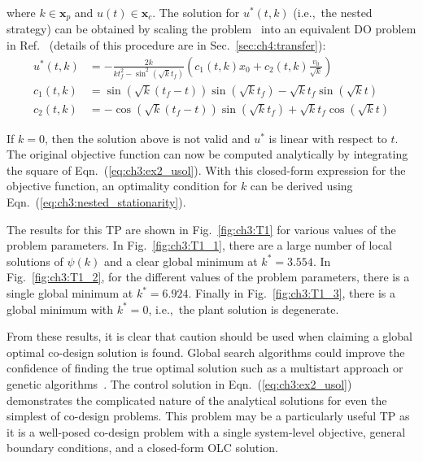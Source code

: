 \noindent where $k\in \bm{x}_p$ and $u(t) \in \bm{x}_c$.
The solution for $u^*(t,k)$ (i.e.,~the nested strategy) can be obtained by scaling the problem~\cite{Herber2017c} into an equivalent DO problem in Ref.~\cite[pp.~166--167]{Bryson1975a} (details of this procedure are in Sec.~\ref{sec:ch4:transfer}):
\begingroup
\allowdisplaybreaks
\begin{subequations}
\label{eq:ch3:ex2_usol}
\begin{align}
u^*(t,k) &= - \frac{2k}{k t_f^2 - \sin^2(\sqrt{k} t_f)} \left( c_1(t,k) x_0 + c_2(t,k) \frac{v_0}{\sqrt{k}} \right) \\
c_1(t,k)  &= \sin\left( \sqrt{k}(t_f - t) \right)\sin\left(\sqrt{k}t_f\right) - \sqrt{k} t_f \sin \left(\sqrt{k}t \right) \\
c_2(t,k)  &= - \cos\left(\sqrt{k}(t_f-t)\right) \sin\left(\sqrt{k}t_f\right) + \sqrt{k} t_f \cos\left(\sqrt{k}t\right)
\end{align}%
\end{subequations}%
\endgroup

\noindent If $k=0$, then the solution above is not valid and $u^*$ is linear with respect to $t$. The original objective function can now be computed analytically by integrating the square of Eqn.~(\ref{eq:ch3:ex2_usol}). With this closed-form expression for the objective function, an optimality condition for $k$ can be derived using Eqn.~(\ref{eq:ch3:nested_stationarity}).

The results for this TP are shown in Fig.~\ref{fig:ch3:T1} for various values of the problem parameters.
In Fig.~\ref{fig:ch3:T1_1}, there are a large number of local solutions of $\psi(k)$ and a clear global minimum at $k^*=3.554$.
In Fig.~\ref{fig:ch3:T1_2}, for the different values of the problem parameters, there is a single global minimum at $k^*= 6.924$.
Finally in Fig.~\ref{fig:ch3:T1_3}, there is a global minimum with $k^*=0$, i.e.,~the plant solution is degenerate.

From these results, it is clear that caution should be used when claiming a global optimal co-design solution is found. Global search algorithms could improve the confidence of finding the true optimal solution such as a multistart approach or genetic algorithms~\cite{Papalambros2017a}. 
The control solution in Eqn.~(\ref{eq:ch3:ex2_usol}) demonstrates the complicated nature of the analytical solutions for even the simplest of co-design problems.
This problem may be a particularly useful TP as it is a well-posed co-design problem with a single system-level objective, general boundary conditions, and a closed-form OLC solution.

